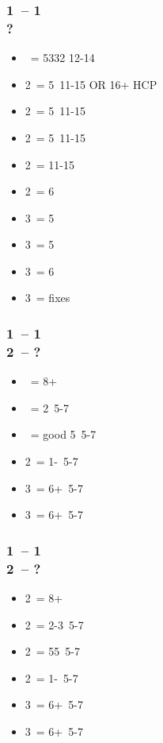 \subsubsection*{1\spades\ -- 1\ntx\ \\ ?}
\begin{itemize}
    \item \pass\ = 5332 12-14
    \item 2\clubs\ = 5\spades\clubs\ 11-15 OR 16+ HCP \fonce
    \item 2\diams\ = 5\diams\ 11-15
    \item 2\hearts\ = 5\hearts\ 11-15
    \item 2\spades\ = 11-15
    \item 2\ntx\ = 6\minor\ \gf
    \item 3\clubs\ = 5\clubs\ \gf
    \item 3\diams\ = 5\diams\ \gf
    \item 3\hearts\ = 6\hearts\ \gf
    \item 3\spades\ = fixes \spades\ \gf
\end{itemize}

\subsubsection*{1\hearts\ -- 1\spades\ \\ 2\clubs\ -- ?}
\begin{itemize}
    \item \diams\ = 8+
    \item \hearts\ = 2\hearts\ 5-7
    \item \spades\ = good 5\spades\ 5-7
    \item 2\ntx\ = 1-\hearts\ 5-7
    \item 3\clubs\ = 6+\clubs\ 5-7
    \item 3\diams\ = 6+\diams\ 5-7
\end{itemize}

\subsubsection*{1\hearts\ -- 1\ntx\ \\ 2\clubs\ -- ?}
\begin{itemize}
    \item 2\diams\ = 8+
    \item 2\hearts\ = 2-3\hearts\ 5-7
    \item 2\spades\ = 55\minor\ 5-7
    \item 2\nt\ = 1-\hearts\ 5-7
    \item 3\clubs\ = 6+\clubs\ 5-7
    \item 3\diams\ = 6+\diams\ 5-7
\end{itemize}

